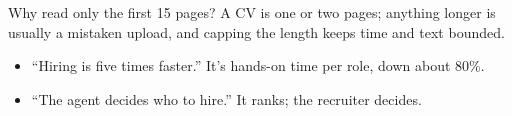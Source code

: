 \begin{iq}{Why read only the first 15 pages?}
A CV is one or two pages; anything longer is usually a mistaken upload, and capping the length keeps time and text bounded.
\end{iq}

\begin{bugfix}
\begin{itemize}
  \item ``Hiring is five times faster.'' It's hands-on time per role, down about 80\%.
  \item ``The agent decides who to hire.'' It ranks; the recruiter decides.
\end{itemize}
\end{bugfix}
